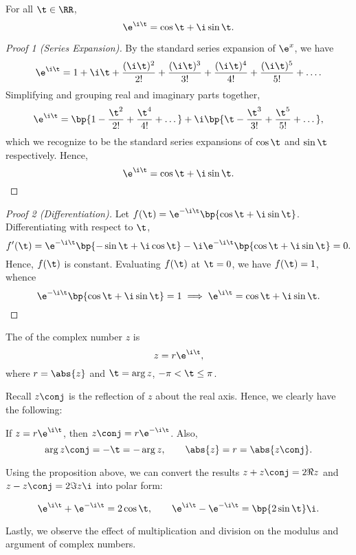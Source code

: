 \begin{theorem}
    For all $\t \in \RR$, \[\e^{\i \t} = \cos \t + \i \sin \t.\]
\end{theorem}
\begin{proof}[Proof 1 (Series Expansion)]
    By the standard series expansion of $\e^x$, we have \[\e^{\i \t} = 1 + \i \t + \frac{(\i \t)^2}{2!} + \frac{(\i \t)^3}{3!} + \frac{(\i \t)^4}{4!} + \frac{(\i \t)^5}{5!} + \dots.\] Simplifying and grouping real and imaginary parts together, \[\e^{\i \t} = \bp{1 - \frac{\t^2}{2!} + \frac{\t^4}{4!} + \dots} + \i \bp{\t - \frac{\t^3}{3!} + \frac{\t^5}{5!} + \dots},\] which we recognize to be the standard series expansions of $\cos \t$ and $\sin \t$ respectively. Hence, \[\e^{\i \t} = \cos \t + \i \sin \t.\]
\end{proof}
\begin{proof}[Proof 2 (Differentiation)]
    Let $f(\t) = \e^{-\i \t} \bp{\cos \t + \i \sin \t}$. Differentiating with respect to $\t$, \[f'(\t) = \e^{-\i \t} \bp{-\sin \t + \i \cos \t} - \i \e^{-\i \t} \bp{\cos \t + \i \sin \t} = 0.\] Hence, $f(\t)$ is constant. Evaluating $f(\t)$ at $\t = 0$, we have $f(\t) = 1$, whence \[\e^{-\i \t} \bp{\cos \t + \i \sin \t} = 1 \implies \e^{\i \t} = \cos \t + \i \sin \t.\]
\end{proof}

\begin{definition}
    The  of the complex number $z$ is \[z = r \e^{\i \t},\] where $r = \abs{z}$ and $\t = \arg{z}$, $-\pi < \t \leq \pi$.
\end{definition}

Recall $z\conj$ is the reflection of $z$ about the real axis. Hence, we clearly have the following:

\begin{proposition}
    If $z = r \e^{\i \t}$, then $z\conj = r\e^{-\i \t}$. Also, \[\arg{z\conj} = -\t = -\arg{z}, \qquad \abs{z} = r = \abs{z \conj}.\]
\end{proposition}

Using the proposition above, we can convert the results $z + z\conj = 2\Re{z}$ and $z - z\conj = 2 \Im{z} \i$ into polar form:

\begin{proposition}
    \[\e^{\i \t} + \e^{-\i \t} = 2\cos \t, \qquad \e^{\i \t} - \e^{-\i \t} = \bp{2 \sin \t} \i.\]
\end{proposition}

Lastly, we observe the effect of multiplication and division on the modulus and argument of complex numbers.

